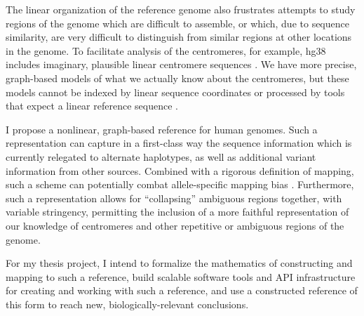 \documentclass[11pt,proposal]{ucthesis}
\begin{document}

The linear organization of the reference genome also frustrates attempts to study regions of the genome which are difficult to assemble, or which, due to sequence similarity, are very difficult to distinguish from similar regions at other locations in the genome. To facilitate analysis of the centromeres, for example, hg38 includes imaginary, plausible linear centromere sequences \cite{karolchik2104new}. We have more precise, graph-based models of what we actually know about the centromeres, but these models cannot be indexed by linear sequence coordinates or processed by tools that expect a linear reference sequence \cite{miga2014centromere}.

I propose a nonlinear, graph-based reference for human genomes. Such a representation can capture in a first-class way the sequence information which is currently relegated to alternate haplotypes, as well as additional variant information from other sources. Combined with a rigorous definition of mapping, such a scheme can potentially combat allele-specific mapping bias \cite{degner2009effect}. Furthermore, such a representation allows for ``collapsing'' ambiguous regions together, with variable stringency, permitting the inclusion of a more faithful representation of our knowledge of centromeres and other repetitive or ambiguous regions of the genome.

For my thesis project, I intend to formalize the mathematics of constructing and mapping to such a reference, build scalable software tools and API infrastructure for creating and working with such a reference, and use a constructed reference of this form to reach new, biologically-relevant conclusions.


    
    
    

    
    
\end{document}
